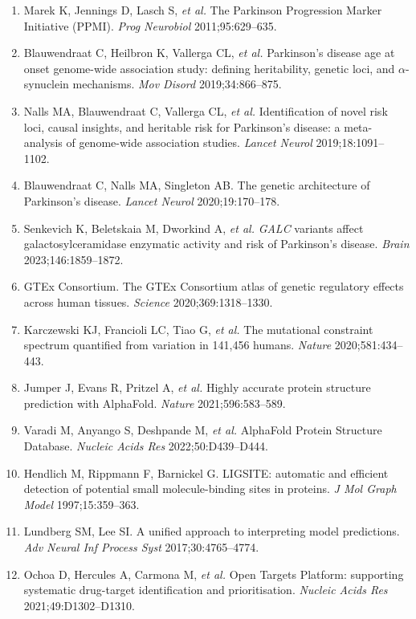 \documentclass[10pt]{article}
\begin{document}
{\footnotesize
\begin{enumerate}\setlength{\itemsep}{1pt}\setlength{\parskip}{0pt}
\item Marek K, Jennings D, Lasch S, \emph{et al.} The Parkinson Progression Marker Initiative (PPMI). \emph{Prog Neurobiol} 2011;95:629--635.
\item Blauwendraat C, Heilbron K, Vallerga CL, \emph{et al.} Parkinson's disease age at onset genome-wide association study: defining heritability, genetic loci, and $\alpha$-synuclein mechanisms. \emph{Mov Disord} 2019;34:866--875.
\item Nalls MA, Blauwendraat C, Vallerga CL, \emph{et al.} Identification of novel risk loci, causal insights, and heritable risk for Parkinson's disease: a meta-analysis of genome-wide association studies. \emph{Lancet Neurol} 2019;18:1091--1102.
\item Blauwendraat C, Nalls MA, Singleton AB. The genetic architecture of Parkinson's disease. \emph{Lancet Neurol} 2020;19:170--178.
\item Senkevich K, Beletskaia M, Dworkind A, \emph{et al.} \emph{GALC} variants affect galactosylceramidase enzymatic activity and risk of Parkinson's disease. \emph{Brain} 2023;146:1859--1872.
\item GTEx Consortium. The GTEx Consortium atlas of genetic regulatory effects across human tissues. \emph{Science} 2020;369:1318--1330.
\item Karczewski KJ, Francioli LC, Tiao G, \emph{et al.} The mutational constraint spectrum quantified from variation in 141,456 humans. \emph{Nature} 2020;581:434--443.
\item Jumper J, Evans R, Pritzel A, \emph{et al.} Highly accurate protein structure prediction with AlphaFold. \emph{Nature} 2021;596:583--589.
\item Varadi M, Anyango S, Deshpande M, \emph{et al.} AlphaFold Protein Structure Database. \emph{Nucleic Acids Res} 2022;50:D439--D444.
\item Hendlich M, Rippmann F, Barnickel G. LIGSITE: automatic and efficient detection of potential small molecule-binding sites in proteins. \emph{J Mol Graph Model} 1997;15:359--363.
\item Lundberg SM, Lee SI. A unified approach to interpreting model predictions. \emph{Adv Neural Inf Process Syst} 2017;30:4765--4774.
\item Ochoa D, Hercules A, Carmona M, \emph{et al.} Open Targets Platform: supporting systematic drug-target identification and prioritisation. \emph{Nucleic Acids Res} 2021;49:D1302--D1310.

\end{enumerate}}
\end{document}
